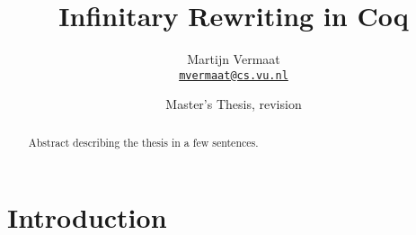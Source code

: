 \documentclass[a4paper,11pt]{article}
\title{Infinitary Rewriting in Coq}
\author{Martijn Vermaat\\[0.3em]
  \href{mailto:mvermaat@cs.vu.nl}{\texttt{mvermaat@cs.vu.nl}}
}
\date{Master's Thesis, revision \svnrev}
\begin{document}
\maketitle


\begin{abstract}
  Abstract describing the thesis in a few sentences.
\end{abstract}


\section{Introduction}\label{sec:introduction}


\pagebreak




\end{document}
